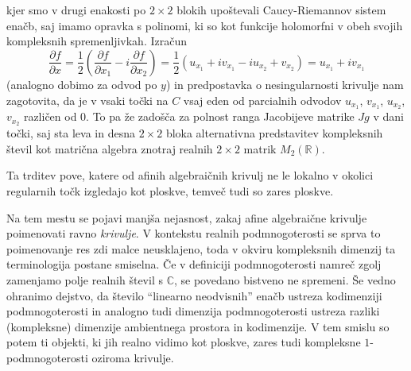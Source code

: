 \documentclass[mat1]{fmfdelo}
\newcommand{\R}{\mathbb R}
\newcommand{\C}{\mathbb C}
\newcommand{\pdv}[2][]{\frac{\partial#1}{\partial#2}}
\theoremstyle{definition}
\begin{document}
\begin{dokaz}
    \\  
    \\ 

    kjer smo v drugi enakosti po $2 \times 2$ blokih upoštevali Caucy-Riemannov sistem enačb, saj imamo opravka s polinomi, ki so kot funkcije holomorfni v obeh svojih kompleksnih spremenljivkah. Izračun
    \[
        \pdv[f]{x} = \frac{1}{2} \left( \pdv[f]{x_1} - i\pdv[f]{x_2}\right) = \frac{1}{2} \left( u_{x_1} + i v_{x_1} - i u_{x_2} + v_{x_2}\right) = u_{x_1} + iv_{x_1}
    \]
    (analogno dobimo za odvod po $y$) in predpostavka o nesingularnosti krivulje nam zagotovita, da je v vsaki točki na $C$ vsaj eden od parcialnih odvodov $u_{x_1}$, $v_{x_1}$, $u_{x_2}$, $v_{x_2}$ različen od $0$. To pa že zadošča za polnost ranga Jacobijeve matrike $Jg$ v dani točki, saj sta leva in desna $2 \times 2$ bloka alternativna predstavitev kompleksnih števil kot matrična algebra znotraj realnih $2 \times2$ matrik $M_2(\R)$.  
\end{dokaz}

Ta trditev pove, katere od afinih algebraičnih krivulj ne le lokalno v okolici regularnih točk izgledajo kot ploskve, temveč tudi so zares ploskve. 
\\
\par
Na tem mestu se pojavi manjša nejasnost, zakaj afine algebraične krivulje poimenovati ravno \emph{krivulje}. V kontekstu realnih podmnogoterosti se sprva to poimenovanje res zdi malce neusklajeno, toda v okviru kompleksnih dimenzij ta terminologija postane smiselna. Če v definiciji podmnogoterosti namreč zgolj zamenjamo polje realnih števil s $\C$, se povedano bistveno ne spremeni. Še vedno ohranimo dejstvo, da število ``linearno neodvisnih'' enačb ustreza kodimenziji podmnogoterosti in analogno tudi dimenzija podmnogoterosti ustreza razliki (kompleksne) dimenzije ambientnega prostora in kodimenzije. V tem smislu so potem ti objekti, ki jih realno vidimo kot ploskve, zares tudi kompleksne $1$-podmnogoterosti oziroma krivulje.
\end{document}
